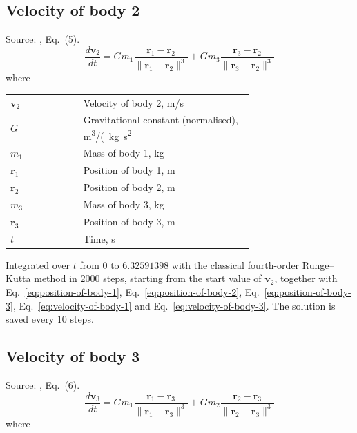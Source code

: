 \subsection{Velocity of body 2}
Source: \cite{chenciner2000}, Eq.~(5).
\begin{equation}
  \frac{d\mathbf{v}_2}{dt} = G m_1 \frac{\mathbf{r}_1 - \mathbf{r}_2}{\|\mathbf{r}_1 - \mathbf{r}_2\|^3} + G m_3 \frac{\mathbf{r}_3 - \mathbf{r}_2}{\|\mathbf{r}_3 - \mathbf{r}_2\|^3}
  \label{eq:velocity-of-body-2}
\end{equation}
\noindent where

\noindent\begin{tabular}{@{\quad}l@{\quad}p{0.7\linewidth}@{}}
  $\mathbf{v}_2$ & Velocity of body 2, \si{m/s} \\
  $G$ & Gravitational constant (normalised), \si{m^{3}/(kg.s^{2}} \\
  $m_1$ & Mass of body 1, \si{kg} \\
  $\mathbf{r}_1$ & Position of body 1, \si{m} \\
  $\mathbf{r}_2$ & Position of body 2, \si{m} \\
  $m_3$ & Mass of body 3, \si{kg} \\
  $\mathbf{r}_3$ & Position of body 3, \si{m} \\
  $t$ & Time, \si{s} \\
\end{tabular}

\noindent Integrated over $t$ from $0$ to $6.32591398$ with the classical fourth-order Runge–Kutta method in 2000 steps, starting from the start value of $\mathbf{v}_2$, together with Eq.~\eqref{eq:position-of-body-1}, Eq.~\eqref{eq:position-of-body-2}, Eq.~\eqref{eq:position-of-body-3}, Eq.~\eqref{eq:velocity-of-body-1} and Eq.~\eqref{eq:velocity-of-body-3}. The solution is saved every 10 steps.

\subsection{Velocity of body 3}
Source: \cite{chenciner2000}, Eq.~(6).
\begin{equation}
  \frac{d\mathbf{v}_3}{dt} = G m_1 \frac{\mathbf{r}_1 - \mathbf{r}_3}{\|\mathbf{r}_1 - \mathbf{r}_3\|^3} + G m_2 \frac{\mathbf{r}_2 - \mathbf{r}_3}{\|\mathbf{r}_2 - \mathbf{r}_3\|^3}
  \label{eq:velocity-of-body-3}
\end{equation}
\noindent where

